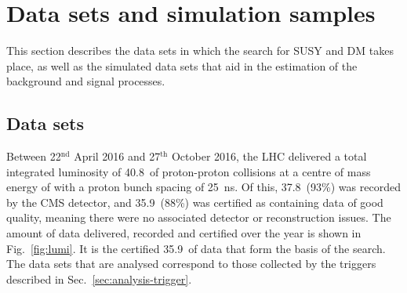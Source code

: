


\section{Data sets and simulation samples}
\label{sec:analysis-samples}
This section describes the data sets in which the search for SUSY and DM takes 
place, as well as the simulated data sets that aid in the estimation of the 
background and signal processes.


\subsection{Data sets}
\label{sec:analysis-samples-data}

Between 22$^\mathrm{nd}$ April 2016 and 27$^\mathrm{th}$ October 2016, the 
LHC delivered a total integrated luminosity of 40.8~\ifb of proton-proton 
collisions at a centre of mass energy of \com with a proton bunch spacing of 
25~ns. Of this, 37.8~\ifb (93\%) was recorded by the CMS detector, and 
35.9~\ifb (88\%) was certified as containing data of good quality, meaning 
there were no associated detector or reconstruction issues. The amount of data 
delivered, recorded and certified over the year is shown in 
Fig.~\ref{fig:lumi}.
It is the certified 35.9~\ifb of data that form the basis of the search. The 
data sets that are analysed correspond to those collected by the triggers 
described in Sec.~\ref{sec:analysis-trigger}.

